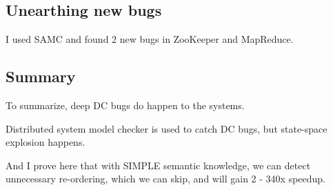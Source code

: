 \subsection{Unearthing new bugs}

I used SAMC and found 2 new bugs in ZooKeeper and MapReduce.

\subsection{Summary}

To summarize, deep DC bugs do happen to the systems.

Distributed system model checker is used to catch DC bugs, but state-space
explosion happens.

And I prove here that with SIMPLE semantic knowledge, we can detect unnecessary
re-ordering, which we can skip, and will gain 2 - 340x speedup.


